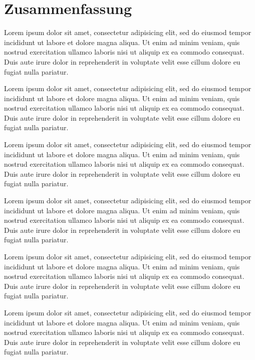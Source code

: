 \chapter*{Zusammenfassung}\label{chapter:zusammenfassung}
 Lorem ipsum dolor sit amet, consectetur adipisicing elit, sed do eiusmod
tempor incididunt ut labore et dolore magna aliqua. Ut enim ad minim veniam, quis
nostrud exercitation ullamco laboris nisi ut aliquip ex ea commodo consequat. Duis aute
irure dolor in reprehenderit in voluptate velit esse cillum dolore eu fugiat nulla pariatur.


 Lorem ipsum dolor sit amet, consectetur adipisicing elit, sed do eiusmod
tempor incididunt ut labore et dolore magna aliqua. Ut enim ad minim veniam, quis
nostrud exercitation ullamco laboris nisi ut aliquip ex ea commodo consequat. Duis aute
irure dolor in reprehenderit in voluptate velit esse cillum dolore eu fugiat nulla pariatur.


 Lorem ipsum dolor sit amet, consectetur adipisicing elit, sed do eiusmod
tempor incididunt ut labore et dolore magna aliqua. Ut enim ad minim veniam, quis
nostrud exercitation ullamco laboris nisi ut aliquip ex ea commodo consequat. Duis aute
irure dolor in reprehenderit in voluptate velit esse cillum dolore eu fugiat nulla pariatur.


 Lorem ipsum dolor sit amet, consectetur adipisicing elit, sed do eiusmod
tempor incididunt ut labore et dolore magna aliqua. Ut enim ad minim veniam, quis
nostrud exercitation ullamco laboris nisi ut aliquip ex ea commodo consequat. Duis aute
irure dolor in reprehenderit in voluptate velit esse cillum dolore eu fugiat nulla pariatur.


 Lorem ipsum dolor sit amet, consectetur adipisicing elit, sed do eiusmod
tempor incididunt ut labore et dolore magna aliqua. Ut enim ad minim veniam, quis
nostrud exercitation ullamco laboris nisi ut aliquip ex ea commodo consequat. Duis aute
irure dolor in reprehenderit in voluptate velit esse cillum dolore eu fugiat nulla pariatur.


 Lorem ipsum dolor sit amet, consectetur adipisicing elit, sed do eiusmod
tempor incididunt ut labore et dolore magna aliqua. Ut enim ad minim veniam, quis
nostrud exercitation ullamco laboris nisi ut aliquip ex ea commodo consequat. Duis aute
irure dolor in reprehenderit in voluptate velit esse cillum dolore eu fugiat nulla pariatur.

\doit
